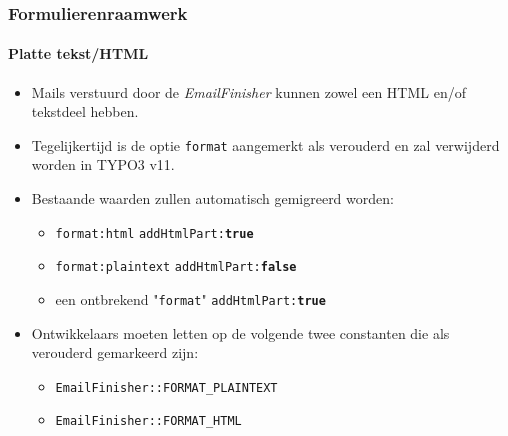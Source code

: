 \begin{frame}[fragile]
	\frametitle{Formulierenraamwerk}
	\framesubtitle{Platte tekst/HTML}

	\begin{itemize}
		\item Mails verstuurd door de \textit{EmailFinisher} kunnen zowel een HTML en/of tekstdeel hebben.

		\item Tegelijkertijd is de optie \texttt{format} aangemerkt als verouderd en zal verwijderd worden in TYPO3 v11.

		\item Bestaande waarden zullen automatisch gemigreerd worden:

			\begin{itemize}\smaller
				\item \texttt{format:html} \tabto{3cm}\textrightarrow\hspace{0.1cm}\texttt{addHtmlPart:\textbf{true}}
				\item \texttt{format:plaintext} \tabto{3cm}\textrightarrow\hspace{0.1cm}\texttt{addHtmlPart:\textbf{false}}
				\item een ontbrekend "\texttt{format}" \tabto{3cm}\textrightarrow\hspace{0.1cm}\texttt{addHtmlPart:\textbf{true}}
			\end{itemize}\normalsize

		\item Ontwikkelaars moeten letten op de volgende twee constanten die als verouderd gemarkeerd zijn:

			\begin{itemize}\smaller
				\item \texttt{EmailFinisher::FORMAT\_PLAINTEXT}
				\item \texttt{EmailFinisher::FORMAT\_HTML}
			\end{itemize}\normalsize

	\end{itemize}

\end{frame}


